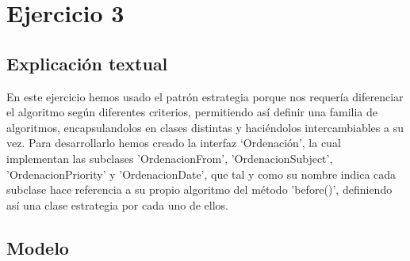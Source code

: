 \documentclass[11pt,a4paper]{article}
\begin{document}











\section{Ejercicio 3}


\subsection{Explicación textual}

En este ejercicio hemos usado el patrón estrategia porque nos requería diferenciar el algoritmo según diferentes criterios, permitiendo así definir una familia de algoritmos, encapsulandolos en clases distintas y haciéndolos intercambiables a su vez. Para desarrollarlo hemos creado la interfaz ‘Ordenación', la cual implementan las subclases 'OrdenacionFrom', 'OrdenacionSubject', 'OrdenacionPriority' y  'OrdenacionDate', que tal y como su nombre indica cada subclase hace referencia a su propio algoritmo del método 'before()', definiendo así una clase estrategia por cada uno de ellos.


\subsection{Modelo}

\begin{figure}[H]
\end{figure}
\end{document}
